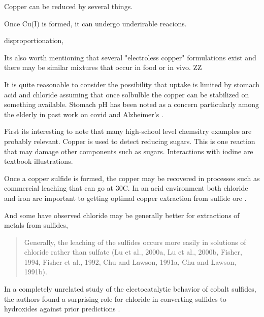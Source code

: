 Copper can be reduced by several things.





Once Cu(I) is formed, it can undergo underirable reacions.

\cite{SAMUNI_ARONOVITCH_GODINGER_cytotoxicity_1983}


disproportionation,


Its also worth mentioning that several "electroless copper"
formulations exist and there may be similar mixtures
that occur in food or in vivo. ZZ


It is quite reasonable to consider the possibility that
uptake is limited by stomach acid and chloride assuming
that once solbulble the copper can be stabilized on something
available. Stomach pH has been noted as a concern particularly
among the elderly in past work on covid 
\cite{mmarchywka-MJM-2020-002-0.10}
and Alzheimer's
\cite{marchywka-MJM-2023-008-0.30rg}. 


First its interesting to note that many high-school
level chemsitry examples are probably relevant. 
Copper is used to detect reducing sugars.
This is one reaction that may damage other components
such as sugars.
Interactions with iodine are textbook illustrations.


Once a copper sulfide is formed, the copper may be recovered
in processes such as commercial leaching that can go at
30C. In an acid environment both chloride and iron 
are important to getting optimal copper extraction from 
sulfide ore 
\cite{Salinas_Herreros_Torres_Leaching_Primary_Copper_2018}.

And some have observed chloride may be generally better
for extractions of metals from sulfides, 
\cite{Herreros_Vinals_Leaching_sulfide_copper_2007}
\begin{quote}
Generally, the leaching of the sulfides occurs more easily in solutions of chloride rather than sulfate (Lu et al., 2000a, Lu et al., 2000b, Fisher, 1994, Fisher et al., 1992, Chu and Lawson, 1991a, Chu and Lawson, 1991b). 
\end{quote}
In a completely unrelated study of the electocatalytic behavior of
cobalt sulfides, the authors found a surprising role for chloride
in converting sulfides to hydroxides against prior predictions
\cite{PMID39915902}.

